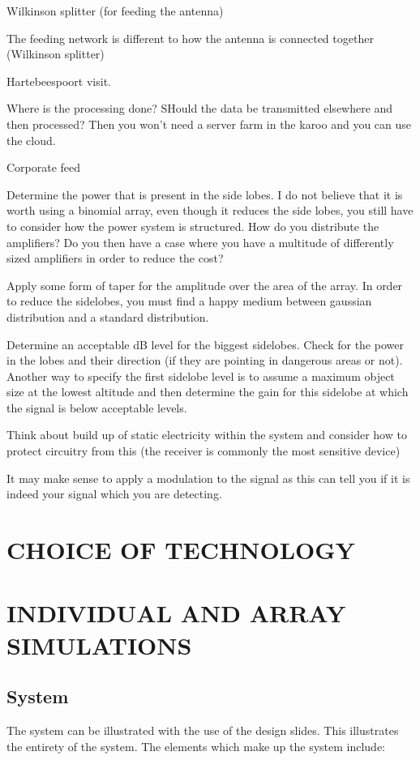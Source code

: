 \documentclass[11pt]{witseiepaper}
\begin{document}
Wilkinson splitter (for feeding the antenna)

The feeding network is different to how the antenna is connected together (Wilkinson splitter)

Hartebeespoort visit.

Where is the processing done? SHould the data be transmitted elsewhere and then processed? Then you won't need a server farm in the karoo and you can use the cloud.


Corporate feed

Determine the power that is present in the side lobes. 
I do not believe that it is worth using a binomial array, even though it reduces the side lobes, you still have to consider how the power system is structured. How do you distribute the amplifiers? Do you then have a case where you have a multitude of differently sized amplifiers in order to reduce the cost? 

Apply some form of taper for the amplitude over the area of the array.
In order to reduce the sidelobes, you must find a happy medium between gaussian distribution and a standard distribution.

Determine an acceptable dB level for the biggest sidelobes. Check for the power in the lobes and their direction (if they are pointing in dangerous areas or not). Another way to specify the first sidelobe level is to assume a maximum object size at the lowest altitude and then determine the gain for this sidelobe at which the signal is below acceptable levels.

Think about build up of static electricity within the system and consider how to protect circuitry from this (the receiver is commonly the most sensitive device)

It may make sense to apply a modulation to the signal as this can tell you if it is indeed your signal which you are detecting.



\section{CHOICE OF TECHNOLOGY}

\section{INDIVIDUAL AND ARRAY SIMULATIONS}

\subsection{System}
The system can be illustrated with the use of the design slides. This illustrates the entirety of the system.
The elements which make up the system include:
\end{document}
